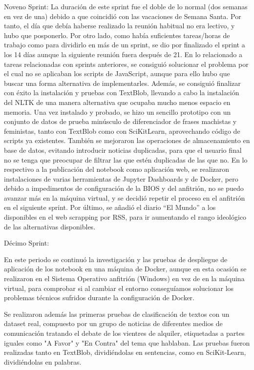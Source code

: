 Noveno Sprint:
La duración de este sprint fue el doble de lo normal (dos semanas en vez de una) debido a que coincidió con las vacaciones de Semana Santa. Por tanto, el día que debía haberse realizado la reunión habitual no era lectivo, y hubo que posponerlo. 
Por otro lado, como había suficientes tareas/horas de trabajo como para dividirlo en más de un sprint, se dio por finalizado el sprint a los 14 días aunque la siguiente reunión fuera después de 21.
En lo relacionado a tareas relacionadas con sprints anteriores, se consiguió solucionar el problema por el cual no se aplicaban los scripts de JavaScript, aunque para ello hubo que buscar una forma alternativa de implementarles.
Además, se consiguió finalizar con éxito la instalación y pruebas con TextBlob, llevando a cabo la instalación del NLTK de una manera alternativa que ocupaba mucho menos espacio en memoria. Una vez instalado y probado, se hizo un sencillo prototipo con un conjunto de datos de prueba minúsculo de diferenciador de frases machistas y feministas, tanto con TextBlob como con SciKitLearn, aprovechando código de scripts ya existentes.
También se mejoraron las operaciones de almacenamiento en base de datos, evitando introducir noticias duplicadas, para que el usuario final no se tenga que preocupar de filtrar las que estén duplicadas de las que no.
En lo respectivo a la publicación del notebook como aplicación web, se realizaron instalaciones de varias herramientas de Jupyter Dashboards y de Docker, pero debido a impedimentos de configuración de la BIOS y del anfitrión, no se puedo avanzar más en la máquina virtual, y se decidió repetir el proceso en el anfitrión en el siguiente sprint.
Por último, se añadió el diario “El Mundo” a los disponibles en el web scrapping por RSS, para ir aumentando el rango ideológico de las alternativas disponibles.

Décimo Sprint:

En este periodo se continuó la investigación y las pruebas de despliegue de aplicación de los notebook en una máquina de Docker, aunque en esta ocasión se realizaron en el Sistema Operativo anfitrión (Windows) en vez de en la máquina virtual, para comprobar si al cambiar el entorno conseguíamos solucionar los problemas técnicos sufridos durante la configuración de Docker.

Se realizaron además las primeras pruebas de clasificación de textos con un dataset real, compuesto por un grupo de noticias de diferentes medios de comunicación tratando el debate de los vientres de alquiler, etiquetadas a partes iguales como "A Favor" y "En Contra" del tema que hablaban. Las pruebas fueron realizadas tanto en TextBlob, dividiéndolas en sentencias, como en SciKit-Learn, dividiéndolas en palabras.


